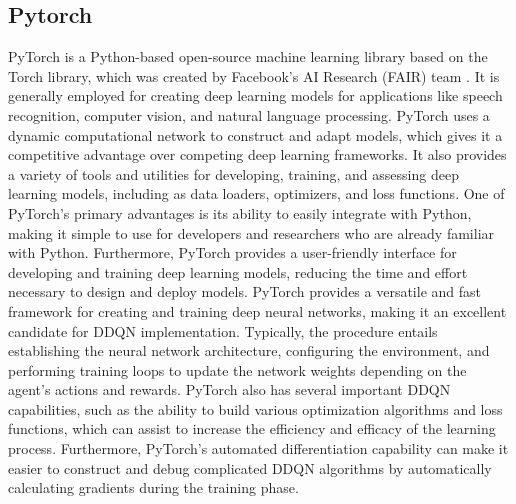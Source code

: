 \documentclass[12pt,oneside]{article}
\begin{document}
\subsection{Pytorch}
PyTorch is a Python-based open-source machine learning library based on the Torch library, which was created by Facebook's AI Research (FAIR) team \cite{37_wang2019various}. It is generally employed for creating deep learning models for applications like speech recognition, computer vision, and natural language processing. PyTorch uses a dynamic computational network to construct and adapt models, which gives it a competitive advantage over competing deep learning frameworks. It also provides a variety of tools and utilities for developing, training, and assessing deep learning models, including as data loaders, optimizers, and loss functions. One of PyTorch's primary advantages is its ability to easily integrate with Python, making it simple to use for developers and researchers who are already familiar with Python. Furthermore, PyTorch provides a user-friendly interface for developing and training deep learning models, reducing the time and effort necessary to design and deploy models.
PyTorch provides a versatile and fast framework for creating and training deep neural networks, making it an excellent candidate for DDQN implementation. Typically, the procedure entails establishing the neural network architecture, configuring the environment, and performing training loops to update the network weights depending on the agent's actions and rewards. PyTorch also has several important DDQN capabilities, such as the ability to build various optimization algorithms and loss functions, which can assist to increase the efficiency and efficacy of the learning process. Furthermore, PyTorch's automated differentiation capability can make it easier to construct and debug complicated DDQN algorithms by automatically calculating gradients during the training phase.
\end{document}
